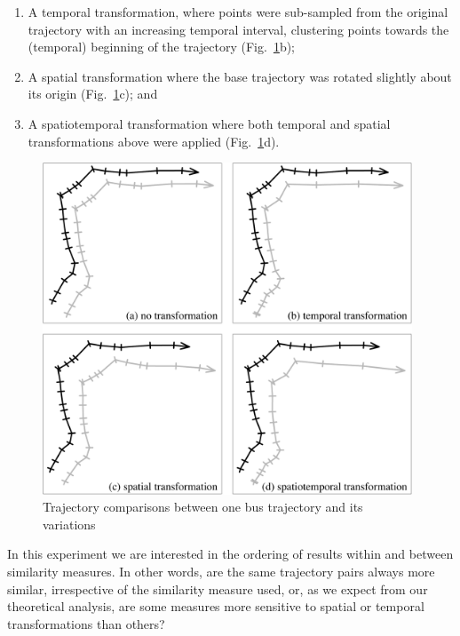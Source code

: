 \documentclass[10pt,letterpaper]{article}
\begin{document}
\begin{enumerate}
\item A temporal transformation, where points were sub-sampled from the original trajectory with an increasing temporal interval, clustering points towards the (temporal) beginning of the trajectory (Fig.~\ref{fig:sample bus}b);
\item A spatial transformation where the base trajectory was rotated slightly about its origin (Fig.~\ref{fig:sample bus}c); and
\item A spatiotemporal transformation where both temporal and spatial transformations  above were applied (Fig.~\ref{fig:sample bus}d).
\end{enumerate}

\begin{figure}[ht]
	 \centering
	 \includegraphics[width=110mm]{figures/trajectoryComparisons}
\caption{Trajectory comparisons between one bus trajectory and its variations}
\label{fig:sample bus}	
\end{figure}

In this experiment we are interested in the ordering of results within and between similarity measures. In other words, are the same trajectory pairs always more similar, irrespective of the similarity measure used, or, as we expect from our theoretical analysis, are some measures more sensitive to spatial or temporal transformations than others?
\end{document}
